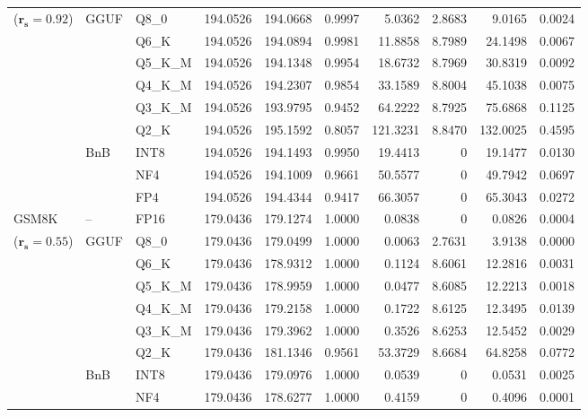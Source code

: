 \begin{longtable}{ll l rrrrrrr}
{\small ($\mathbf{r_s{=}0.92}$)} & GGUF & Q8\_0 & 194.0526 & 194.0668 & 0.9997 & 5.0362 & 2.8683 & 9.0165 & 0.0024 \\
 &  & Q6\_K & 194.0526 & 194.0894 & 0.9981 & 11.8858 & 8.7989 & 24.1498 & 0.0067 \\
 &  & Q5\_K\_M & 194.0526 & 194.1348 & 0.9954 & 18.6732 & 8.7969 & 30.8319 & 0.0092 \\
 &  & Q4\_K\_M & 194.0526 & 194.2307 & 0.9854 & 33.1589 & 8.8004 & 45.1038 & 0.0075 \\
 &  & Q3\_K\_M & 194.0526 & 193.9795 & \cellcolor{red!18} 0.9452 & \cellcolor{red!18} 64.2222 & 8.7925 & \cellcolor{red!18} 75.6868 & \cellcolor{red!18} 0.1125 \\
 &  & Q2\_K & 194.0526 & 195.1592 & \cellcolor{red!18} 0.8057 & \cellcolor{red!18} 121.3231 & 8.8470 & \cellcolor{red!18} 132.0025 & \cellcolor{red!18} 0.4595 \\
 & BnB & INT8 & 194.0526 & 194.1493 & 0.9950 & 19.4413 & \cellcolor{cyan!12} $0$ & 19.1477 & 0.0130 \\
 &  & NF4 & 194.0526 & 194.1009 & 0.9661 & 50.5577 & \cellcolor{cyan!12} $0$ & 49.7942 & 0.0697 \\
 &  & FP4 & 194.0526 & 194.4344 & \cellcolor{red!18} 0.9417 & \cellcolor{red!18} 66.3057 & \cellcolor{cyan!12} $0$ & \cellcolor{red!18} 65.3043 & \cellcolor{red!18} 0.0272 \\
\midrule
GSM8K & -- & FP16 & 179.0436 & 179.1274 & 1.0000 & 0.0838 & \cellcolor{cyan!12} $0$ & 0.0826 & 0.0004 \\
{\small ($\mathbf{r_s{=}0.55}$)} & GGUF & Q8\_0 & 179.0436 & 179.0499 & 1.0000 & 0.0063 & 2.7631 & 3.9138 & 0.0000 \\
 &  & Q6\_K & 179.0436 & 178.9312 & 1.0000 & 0.1124 & 8.6061 & 12.2816 & 0.0031 \\
 &  & Q5\_K\_M & 179.0436 & 178.9959 & 1.0000 & 0.0477 & 8.6085 & 12.2213 & 0.0018 \\
 &  & Q4\_K\_M & 179.0436 & 179.2158 & 1.0000 & 0.1722 & 8.6125 & 12.3495 & 0.0139 \\
 &  & Q3\_K\_M & 179.0436 & 179.3962 & 1.0000 & 0.3526 & 8.6253 & 12.5452 & 0.0029 \\
 &  & Q2\_K & 179.0436 & 181.1346 & 0.9561 & 53.3729 & 8.6684 & 64.8258 & 0.0772 \\
 & BnB & INT8 & 179.0436 & 179.0976 & 1.0000 & 0.0539 & \cellcolor{cyan!12} $0$ & 0.0531 & 0.0025 \\
 &  & NF4 & 179.0436 & 178.6277 & 1.0000 & 0.4159 & \cellcolor{cyan!12} $0$ & 0.4096 & 0.0001 \\

\end{longtable}
